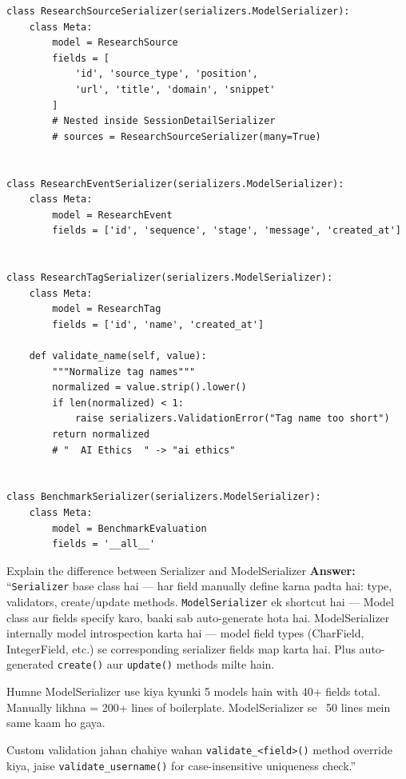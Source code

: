 \documentclass[11pt,a4paper,twoside]{report}
\begin{document}
\begin{lstlisting}[style=pythonstyle,caption={serializers.py --- Nested Serializers}]
class ResearchSourceSerializer(serializers.ModelSerializer):
    class Meta:
        model = ResearchSource
        fields = [
            'id', 'source_type', 'position',
            'url', 'title', 'domain', 'snippet'
        ]
        # Nested inside SessionDetailSerializer
        # sources = ResearchSourceSerializer(many=True)


class ResearchEventSerializer(serializers.ModelSerializer):
    class Meta:
        model = ResearchEvent
        fields = ['id', 'sequence', 'stage', 'message', 'created_at']


class ResearchTagSerializer(serializers.ModelSerializer):
    class Meta:
        model = ResearchTag
        fields = ['id', 'name', 'created_at']

    def validate_name(self, value):
        """Normalize tag names"""
        normalized = value.strip().lower()
        if len(normalized) < 1:
            raise serializers.ValidationError("Tag name too short")
        return normalized
        # "  AI Ethics  " -> "ai ethics"


class BenchmarkSerializer(serializers.ModelSerializer):
    class Meta:
        model = BenchmarkEvaluation
        fields = '__all__'
\end{lstlisting}

\begin{interviewbox}{Explain the difference between Serializer and ModelSerializer}
\textbf{Answer:} ``\texttt{Serializer} base class hai --- har field manually define karna padta hai: type, validators, create/update methods. \texttt{ModelSerializer} ek shortcut hai --- Model class aur fields specify karo, baaki sab auto-generate hota hai. ModelSerializer internally model introspection karta hai --- model field types (CharField, IntegerField, etc.) se corresponding serializer fields map karta hai. Plus auto-generated \texttt{create()} aur \texttt{update()} methods milte hain.

Humne ModelSerializer use kiya kyunki 5 models hain with 40+ fields total. Manually likhna = 200+ lines of boilerplate. ModelSerializer se ~50 lines mein same kaam ho gaya.

Custom validation jahan chahiye wahan \texttt{validate\_<field>()} method override kiya, jaise \texttt{validate\_username()} for case-insensitive uniqueness check.''
\end{interviewbox}
\end{document}
